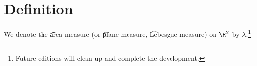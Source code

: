 
\section*{Definition}

We denote the \t{area measure} (or \t{plane measure}, \t{Lebesgue measure}) on $\R ^2$ by $\lambda $.\footnote{Future editions will clean up and complete the development.}

\blankpage
